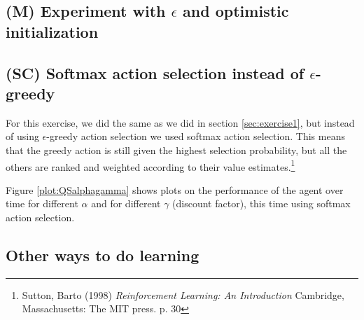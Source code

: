 \documentclass{article}
\begin{document}
\subsection{(M) Experiment with $\epsilon$ and optimistic initialization}\label{sec:exercise2}

\subsection{(SC) Softmax action selection instead of $\epsilon$-greedy}\label{sec:exercise3}
For this exercise, we did the same as we did in section \ref{sec:exercise1}, but instead of using $\epsilon$-greedy action selection we used softmax action selection. This means that the greedy action is still given the highest selection probability, but all the others are ranked and weighted according to their value estimates.\footnote{Sutton, Barto (1998) \textit{Reinforcement Learning: An Introduction} Cambridge, Massachusetts: The MIT press. p. 30}

Figure \ref{plot:QSalphagamma} shows plots on the performance of the agent over time for different $\alpha$ and for different $\gamma$ (discount factor), this time using softmax action selection.

 \label{plot:QSalphagamma}


\subsection{Other ways to do learning}
\end{document}
